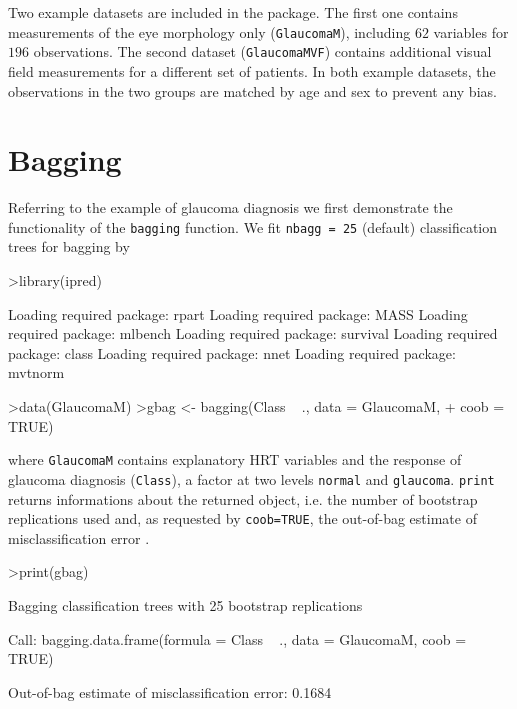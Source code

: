 \documentclass[11pt]{article}
\begin{document}
Two example datasets are included in the package. The first one contains
measurements of the eye morphology only (\texttt{GlaucomaM}), including $62$
variables for $196$ observations. The second dataset (\texttt{GlaucomaMVF})
contains additional visual field measurements for a different set of
patients. In both example datasets, the observations in the two groups are
matched by age and sex to prevent any bias.

\section{Bagging}
Referring to the example of glaucoma diagnosis we first 
demonstrate the functionality of the \texttt{bagging} function. 
We fit \texttt{nbagg = 25} (default) classification trees for bagging by 
\begin{Schunk}
\begin{Sinput}
>library(ipred)
\end{Sinput}
\begin{Soutput}
Loading required package: rpart 
Loading required package: MASS 
Loading required package: mlbench 
Loading required package: survival 
Loading required package: class 
Loading required package: nnet 
Loading required package: mvtnorm 
\end{Soutput}
\begin{Sinput}
>data(GlaucomaM)
>gbag <- bagging(Class ~ ., data = GlaucomaM, 
+     coob = TRUE)
\end{Sinput}
\end{Schunk}
where \texttt{GlaucomaM} contains explanatory HRT variables 
and the response of glaucoma diagnosis (\texttt{Class}), 
a factor at two levels \texttt{normal} and \texttt{glaucoma}.
\texttt{print} returns informations about the returned object,
i.e. the number of bootstrap replications used and, as requested by
\texttt{coob=TRUE}, the out-of-bag estimate of misclassification error 
\citep{out-of-bag:1996}. 
\begin{Schunk}
\begin{Sinput}
>print(gbag)
\end{Sinput}
\begin{Soutput}
Bagging classification trees with 25 bootstrap replications 

Call: bagging.data.frame(formula = Class ~ ., data = GlaucomaM, coob = TRUE)

Out-of-bag estimate of misclassification error:  0.1684 
\end{Soutput}
\end{Schunk}
\end{document}
